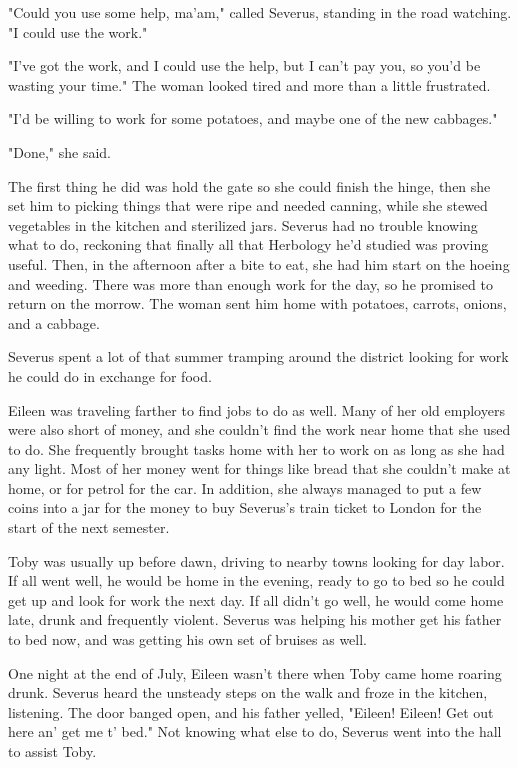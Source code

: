"Could you use some help, ma'am," called Severus, standing in the road watching. "I could use the work."

"I've got the work, and I could use the help, but I can't pay you, so you'd be wasting your time." The woman looked tired and more than a little frustrated.

"I'd be willing to work for some potatoes, and maybe one of the new cabbages."

"Done," she said.

The first thing he did was hold the gate so she could finish the hinge, then she set him to picking things that were ripe and needed canning, while she stewed vegetables in the kitchen and sterilized jars. Severus had no trouble knowing what to do, reckoning that finally all that Herbology he'd studied was proving useful. Then, in the afternoon after a bite to eat, she had him start on the hoeing and weeding. There was more than enough work for the day, so he promised to return on the morrow. The woman sent him home with potatoes, carrots, onions, and a cabbage.

Severus spent a lot of that summer tramping around the district looking for work he could do in exchange for food.

Eileen was traveling farther to find jobs to do as well. Many of her old employers were also short of money, and she couldn't find the work near home that she used to do. She frequently brought tasks home with her to work on as long as she had any light. Most of her money went for things like bread that she couldn't make at home, or for petrol for the car. In addition, she always managed to put a few coins into a jar for the money to buy Severus's train ticket to London for the start of the next semester.

Toby was usually up before dawn, driving to nearby towns looking for day labor. If all went well, he would be home in the evening, ready to go to bed so he could get up and look for work the next day. If all didn't go well, he would come home late, drunk and frequently violent. Severus was helping his mother get his father to bed now, and was getting his own set of bruises as well.

One night at the end of July, Eileen wasn't there when Toby came home roaring drunk. Severus heard the unsteady steps on the walk and froze in the kitchen, listening. The door banged open, and his father yelled, "Eileen! Eileen! Get out here an' get me t' bed." Not knowing what else to do, Severus went into the hall to assist Toby.

